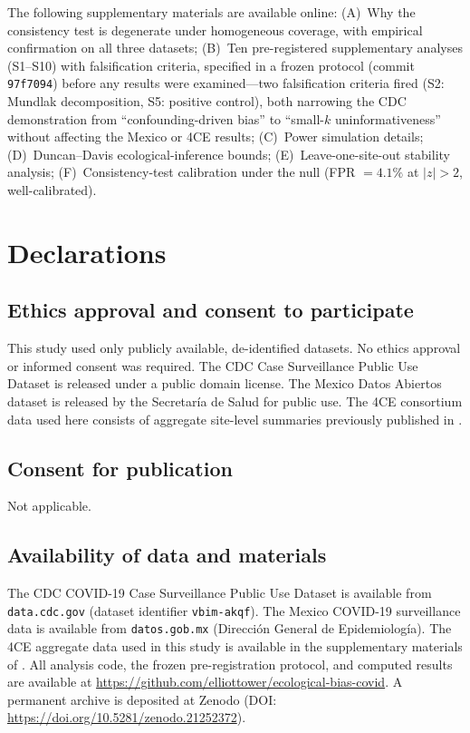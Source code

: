 \documentclass[11pt]{article}
\begin{document}
The following supplementary materials are available online:
(A)~Why the consistency test is degenerate under homogeneous
coverage, with empirical confirmation on all three datasets;
(B)~Ten pre-registered supplementary
analyses (S1--S10) with falsification criteria, specified in a frozen
protocol (commit \texttt{97f7094}) before any results were examined---two
falsification criteria fired (S2: Mundlak decomposition, S5: positive
control), both narrowing the CDC demonstration from ``confounding-driven
bias'' to ``small-$k$ uninformativeness'' without affecting the Mexico
or 4CE results; (C)~Power simulation details;
(D)~Duncan--Davis ecological-inference bounds; (E)~Leave-one-site-out
stability analysis; (F)~Consistency-test calibration under the null
(FPR $= 4.1\%$ at $|z| > 2$, well-calibrated).


\section*{Declarations}

\subsection*{Ethics approval and consent to participate}
This study used only publicly available, de-identified datasets.  No
ethics approval or informed consent was required.  The CDC Case
Surveillance Public Use Dataset is released under a public domain license.
The Mexico Datos Abiertos dataset is released by the Secretar\'{i}a de
Salud for public use.  The 4CE consortium data used here consists of
aggregate site-level summaries previously published in
\cite{four_ce_neuro2021}.

\subsection*{Consent for publication}
Not applicable.

\subsection*{Availability of data and materials}
The CDC COVID-19 Case Surveillance Public Use Dataset is available from
\texttt{data.cdc.gov} (dataset identifier \texttt{vbim-akqf}).  The
Mexico COVID-19 surveillance data is available from \texttt{datos.gob.mx}
(Direcci\'{o}n General de Epidemiolog\'{i}a).  The 4CE aggregate data
used in this study is available in the supplementary materials of
\cite{four_ce_neuro2021}.  All analysis code, the frozen
pre-registration protocol, and computed results are available at
\url{https://github.com/elliottower/ecological-bias-covid}.
A permanent archive is deposited at Zenodo
(DOI: \url{https://doi.org/10.5281/zenodo.21252372}).
\end{document}

